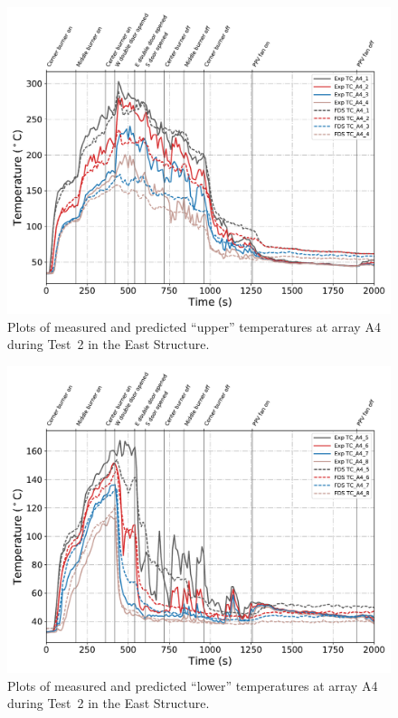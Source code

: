 \clearpage
\begin{figure}[p]
	\centering
	\includegraphics[width=\columnwidth]{Figures/Plots/Validation/Temperature/Test_2_TC_A4_upper}
	\caption{Plots of measured and predicted ``upper'' temperatures at array A4 during Test~2 in the East Structure.}
	\label{fig:TCA4_upper_data_Test2}
\end{figure}
\begin{figure}[p]
	\centering
	\includegraphics[width=\columnwidth]{Figures/Plots/Validation/Temperature/Test_2_TC_A4_lower}
	\caption{Plots of measured and predicted ``lower'' temperatures at array A4 during Test~2 in the East Structure.}
	\label{fig:TCA4_lower_data_Test2}
\end{figure}


